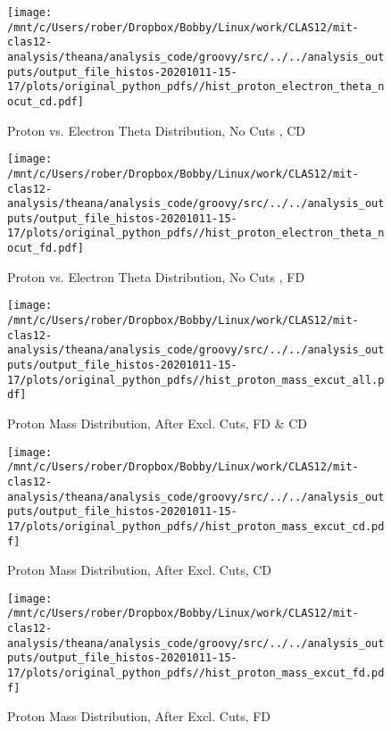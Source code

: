 \documentclass{article}
\begin{document}
\begin{landscape}
\begin{figure}[h]
        \texttt{[image: /mnt/c/Users/rober/Dropbox/Bobby/Linux/work/CLAS12/mit-clas12-analysis/theana/analysis\_code/groovy/src/../../analysis\_outputs/output\_file\_histos-20201011-15-17/plots/original\_python\_pdfs//hist\_proton\_electron\_theta\_nocut\_cd.pdf]}
        \captionsetup{textformat=empty,labelformat=blank}
        \caption{Proton vs. Electron Theta Distribution, No Cuts , CD}
    \end{figure}
    \clearpage
    
    \begin{figure}[h]
        \centering

        \texttt{[image: /mnt/c/Users/rober/Dropbox/Bobby/Linux/work/CLAS12/mit-clas12-analysis/theana/analysis\_code/groovy/src/../../analysis\_outputs/output\_file\_histos-20201011-15-17/plots/original\_python\_pdfs//hist\_proton\_electron\_theta\_nocut\_fd.pdf]}
        \captionsetup{textformat=empty,labelformat=blank}
        \caption{Proton vs. Electron Theta Distribution, No Cuts , FD}
    \end{figure}
    \clearpage
    
    \begin{figure}[h]
        \centering

        \texttt{[image: /mnt/c/Users/rober/Dropbox/Bobby/Linux/work/CLAS12/mit-clas12-analysis/theana/analysis\_code/groovy/src/../../analysis\_outputs/output\_file\_histos-20201011-15-17/plots/original\_python\_pdfs//hist\_proton\_mass\_excut\_all.pdf]}
        \captionsetup{textformat=empty,labelformat=blank}
        \caption{Proton Mass Distribution, After Excl. Cuts, FD \& CD}
    \end{figure}
    \clearpage
    
    \begin{figure}[h]
        \centering

        \texttt{[image: /mnt/c/Users/rober/Dropbox/Bobby/Linux/work/CLAS12/mit-clas12-analysis/theana/analysis\_code/groovy/src/../../analysis\_outputs/output\_file\_histos-20201011-15-17/plots/original\_python\_pdfs//hist\_proton\_mass\_excut\_cd.pdf]}
        \captionsetup{textformat=empty,labelformat=blank}
        \caption{Proton Mass Distribution, After Excl. Cuts, CD}
    \end{figure}
    \clearpage
    
    \begin{figure}[h]
        \centering

        \texttt{[image: /mnt/c/Users/rober/Dropbox/Bobby/Linux/work/CLAS12/mit-clas12-analysis/theana/analysis\_code/groovy/src/../../analysis\_outputs/output\_file\_histos-20201011-15-17/plots/original\_python\_pdfs//hist\_proton\_mass\_excut\_fd.pdf]}
        \captionsetup{textformat=empty,labelformat=blank}
        \caption{Proton Mass Distribution, After Excl. Cuts, FD}
    \end{figure}
    \clearpage
    

\end{landscape}
\end{document}
